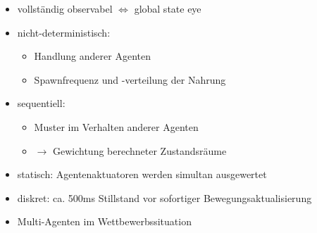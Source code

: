 \documentclass[a4paper,12pt]{article} %
\begin{document}
\begin{itemize}
    \item vollständig observabel $\Longleftrightarrow$ global state eye
    \item nicht-deterministisch:
    \begin{itemize}
        \item Handlung anderer Agenten
        \item Spawnfrequenz und -verteilung der Nahrung
    \end{itemize}
    \item sequentiell:
    \begin{itemize}
        \item Muster im Verhalten anderer Agenten
        \item $\longrightarrow$ Gewichtung berechneter Zustandsräume
    \end{itemize}
    \item statisch: Agentenaktuatoren werden simultan ausgewertet
    \item diskret: ca. 500ms Stillstand vor sofortiger Bewegungsaktualisierung
    \item Multi-Agenten im Wettbewerbssituation
\end{itemize}
\end{document}
